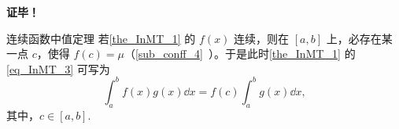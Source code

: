 \textbf{证毕！}

\begin{example}{连续函数中值定理}
若\autoref{the_InMT_1} 的 $f(x)$ 连续，则在 $[a,b]$ 上，必存在某一点 $c$，使得 $f(c)=\mu$（\autoref{sub_conff_4}~）。于是此时\autoref{the_InMT_1} 的\autoref{eq_InMT_3} 可写为
\begin{equation}
\int_a^b f(x)g(x)\dd x=f(c)\int_a^b g(x)\dd x,
\end{equation}
其中，$c\in[a,b].$
\end{example}